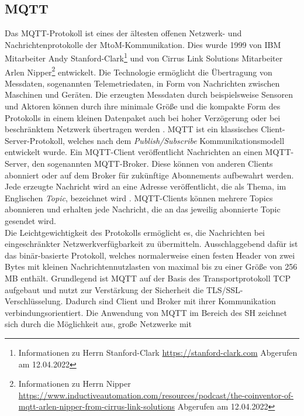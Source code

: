     \subsection{MQTT}
    \label{subsec:mqtt}
        Das \ac{MQTT}-Protokoll ist eines der ältesten offenen Netzwerk- und Nachrichtenprotokolle der 
        \ac{MtoM}-Kommunikation. 
        Dies wurde 1999 von IBM Mitarbeiter Andy Stanford-Clark\footnote{Informationen zu Herrn Stanford-Clark \url{https://stanford-clark.com} Abgerufen am 12.04.2022} 
        und von Cirrus Link Solutions Mitarbeiter Arlen Nipper\footnote{Informationen zu Herrn Nipper \url{https://www.inductiveautomation.com/resources/podcast/the-coinventor-of-mqtt-arlen-nipper-from-cirrus-link-solutions} Abgerufen am 12.04.2022} 
        entwickelt. Die Technologie ermöglicht die Übertragung von Messdaten, sogenannten Telemetriedaten, in Form von 
        Nachrichten zwischen Maschinen und Geräten. Die erzeugten Messdaten durch beispielsweise Sensoren und Aktoren 
        können durch ihre minimale Größe und die kompakte Form des Protokolls in einem kleinen Datenpaket auch bei 
        hoher Verzögerung oder bei beschränktem Netzwerk übertragen werden \cite{Naik2017}. \acs{MQTT} ist ein 
        klassisches Client-Server-Protokoll, welches nach dem \textit{Publish/Subscribe} Kommunikationsmodell 
        entwickelt wurde. Ein \acs{MQTT}-Client veröffentlicht Nachrichten an einen \acs{MQTT}-Server, den sogenannten 
        \acs{MQTT}-Broker. Diese können von anderen Clients abonniert oder auf dem Broker für zukünftige Abonnements 
        aufbewahrt werden. Jede erzeugte Nachricht wird an eine Adresse veröffentlicht, die als Thema, im Englischen \textit{Topic}, 
        bezeichnet wird \cite{Naik2017}. \acs{MQTT}-Clients können mehrere Topics abonnieren und erhalten jede Nachricht, die an 
        das jeweilig abonnierte Topic gesendet wird. 
        \\
        Die Leichtgewichtigkeit des Protokolls ermöglicht es, die Nachrichten bei eingeschränkter Netzwerkverfügbarkeit zu 
        übermitteln. Ausschlaggebend dafür ist das binär-basierte Protokoll, welches normalerweise einen festen Header von 
        zwei Bytes mit kleinen Nachrichtennutzlasten von maximal bis zu einer Größe von 256 MB \cite{Naik2017} enthält. Grundlegend 
        ist \acs{MQTT} auf der Basis des Transportprotokoll \ac{TCP} aufgebaut und nutzt zur Verstärkung der Sicherheit die 
        \ac{TLS}/\ac{SSL}-Verschlüsselung. Dadurch sind Client und Broker mit ihrer Kommunikation verbindungsorientiert. 
        Die Anwendung von \acs{MQTT} im Bereich des \acl{SH} zeichnet sich durch die Möglichkeit aus, große Netzwerke mit 
